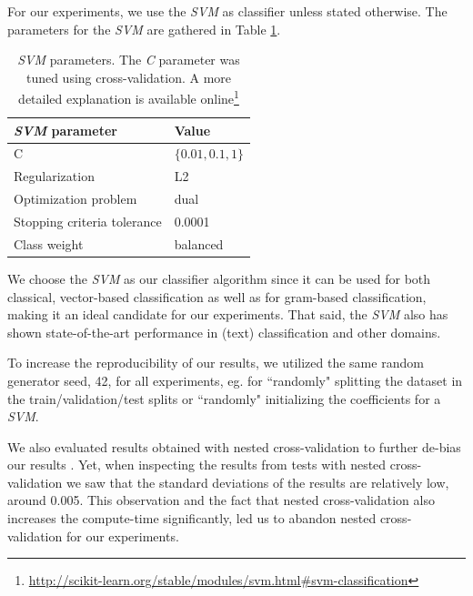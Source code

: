 For our experiments, we use the \textit{SVM}\cite{Cortes1995} as classifier unless stated otherwise.
The parameters for the \textit{SVM} are gathered in Table \ref{table:svm_parameters}.

\begin{table}[htb!]
	\centering
	\begin{tabular}{ll}
		\textit{SVM} parameter & Value  \\
		\toprule
		C & $\{0.01, 0.1, 1\}$ \\
		Regularization & L2 \\
		Optimization problem & dual \\
		Stopping criteria tolerance & 0.0001 \\
		Class weight & balanced \\
		\bottomrule
	\end{tabular}
	\caption[Table: SVM parameters]{\textit{SVM} parameters. The \textit{C} parameter was tuned using cross-validation. A more detailed explanation is available online\footnote{\url{http://scikit-learn.org/stable/modules/svm.html\#svm-classification}}}%
	\label{table:svm_parameters}
\end{table}

We choose the \textit{SVM} as our classifier algorithm since it can be used for both classical, vector-based classification as well as for gram-based classification, making it an ideal candidate for our experiments.
That said, the \textit{SVM} also has shown state-of-the-art performance in (text) classification and other domains.

To increase the reproducibility of our results, we utilized the same random generator seed, 42, for all experiments, eg. for ``randomly" splitting the dataset in the train/validation/test splits or ``randomly" initializing the coefficients for a \textit{SVM}.

We also evaluated results obtained with nested cross-validation to further de-bias our results \cite{Varma2006}. Yet, when inspecting the results from tests with nested cross-validation we saw that the standard deviations of the results are relatively low, around 0.005.
This observation and the fact that nested cross-validation also increases the compute-time significantly, led us to abandon nested cross-validation for our experiments.


